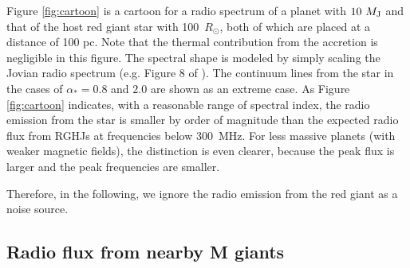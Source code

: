 \documentclass[iop,numberedappendix,apj]{emulateapj}
\begin{document}
Figure \ref{fig:cartoon} is a cartoon for a radio spectrum of a planet with $10~M_{\rm J}$ and that of the host red giant star with 100~$R_{\odot }$, both of which are placed at a distance of 100 pc. 
Note that the thermal contribution from the accretion is negligible in this figure. 
The spectral shape is modeled by simply scaling the Jovian radio spectrum (e.g. Figure 8 of \cite{zarka_et_al2004}). 
The continuum lines from the star in the cases of $\alpha_* =0.8$ and $2.0$ are shown as an extreme case.  
As Figure \ref{fig:cartoon} indicates, with a reasonable range of spectral index, the radio emission from the star is smaller by order of magnitude than the expected radio flux from RGHJs at frequencies below 300~MHz. 
For less massive planets (with weaker magnetic fields), the distinction is even clearer, because the peak flux is larger and the peak frequencies are smaller. 


Therefore, in the following, we ignore the radio emission from the red giant as a noise source. 



\subsection{Radio flux from nearby M giants}
\label{ss:actualMgiants}
\end{document}
